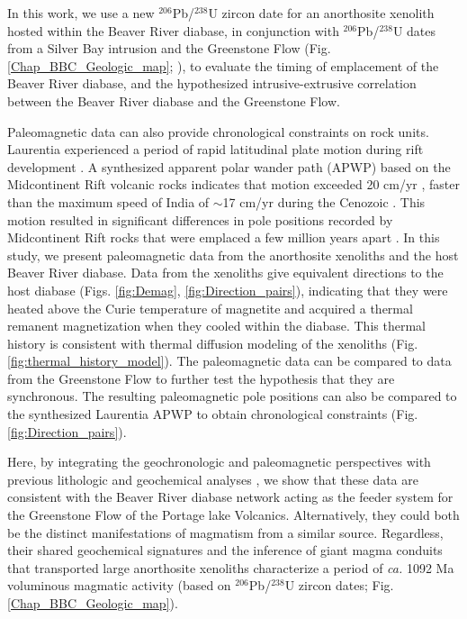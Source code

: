 In this work, we use a new $^{206}$Pb/$^{238}$U zircon date for an anorthosite xenolith hosted within the Beaver River diabase, in conjunction with $^{206}$Pb/$^{238}$U dates from a Silver Bay intrusion and the Greenstone Flow (Fig. \ref{Chap_BBC_Geologic_map}; \cite{Fairchild2017a}), to evaluate the timing of emplacement of the Beaver River diabase, and the hypothesized intrusive-extrusive correlation between the Beaver River diabase and the Greenstone Flow.

Paleomagnetic data can also provide chronological constraints on rock units. Laurentia experienced a period of rapid latitudinal plate motion during rift development \citep{Swanson-Hysell2009a}. A synthesized apparent polar wander path (APWP) based on the Midcontinent Rift volcanic rocks indicates that motion exceeded 20 cm/yr \citep{Swanson-Hysell2019a}, faster than the maximum speed of India of $\sim$17 cm/yr during the Cenozoic \citep{Hinsbergen2011a}. This motion resulted in significant differences in pole positions recorded by Midcontinent Rift rocks that were emplaced a few million years apart \citep{Swanson-Hysell2019a}. In this study, we present paleomagnetic data from the anorthosite xenoliths and the host Beaver River diabase. Data from the xenoliths give equivalent directions to the host diabase (Figs. \ref{fig:Demag}, \ref{fig:Direction_pairs}), indicating that they were heated above the Curie temperature of magnetite and acquired a thermal remanent magnetization when they cooled within the diabase. This thermal history is consistent with thermal diffusion modeling of the xenoliths (Fig. \ref{fig:thermal_history_model}). The paleomagnetic data can be compared to data from the Greenstone Flow to further test the hypothesis that they are synchronous. The resulting paleomagnetic pole positions can also be compared to the synthesized Laurentia APWP to obtain chronological constraints (Fig. \ref{fig:Direction_pairs}).

Here, by integrating the geochronologic and paleomagnetic perspectives with previous lithologic and geochemical analyses \citep{Miller1997a, Doyle2016a}, we show that these data are consistent with the Beaver River diabase network acting as the feeder system for the Greenstone Flow of the Portage lake Volcanics. Alternatively, they could both be the distinct manifestations of magmatism from a similar source. Regardless, their shared geochemical signatures and the inference of giant magma conduits that transported large anorthosite xenoliths characterize a period of \textit{ca.} 1092 Ma voluminous magmatic activity (based on $^{206}$Pb/$^{238}$U zircon dates; Fig. \ref{Chap_BBC_Geologic_map}).

